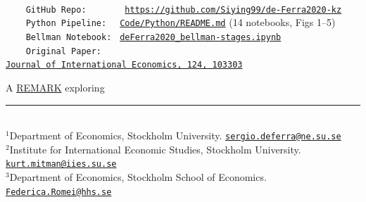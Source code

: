 \documentclass[\latexroot/\projectname]{subfiles}
\begin{document}
\providecommand{\REMARK}{\href{https://github.com/econ-ark/REMARK}{REMARK}}
\begin{footnotesize}
  \setlength{\parskip}{0pt}
  \parbox{0.9\textwidth}{
    \begin{tabbing}
      \texttt{~~~~~~~~~~~~~~~~~~~~~~~} \= \=  \\
      \texttt{~~~~GitHub~Repo:~~~~~~~} \> \> \texttt{\href{https://github.com/Siying99/de-Ferra2020-kz}{https://github.com/Siying99/de-Ferra2020-kz}} \\
      \texttt{~~~~Python~Pipeline:~~} \> \> \texttt{\href{https://github.com/Siying99/de-Ferra2020-kz/blob/main/Code/Python/README.md}{Code/Python/README.md}} \textnormal{(14 notebooks, Figs 1--5)} \\
      \texttt{~~~~Bellman~Notebook:~} \> \> \texttt{\href{https://github.com/Siying99/de-Ferra2020-kz/blob/main/deFerra2020\_bellman-stages.ipynb}{deFerra2020\_bellman-stages.ipynb}} \\
      \texttt{~~~~Original~Paper:~~~~} \> \> \texttt{\href{https://doi.org/10.1016/j.jinteco.2020.103303}{Journal~of~International~Economics,~124,~103303}} \\
    \end{tabbing}
  } %
\end{footnotesize}
\vspace{-0.3\baselineskip}

\centerline{A \href{https://github.com/econ-ark/REMARK}{REMARK} exploring \cite{de-Ferra2019-co}}
\vspace{-0.3\baselineskip}

\vfill
\begin{footnotesize}
  \noindent\rule{\textwidth}{0.4pt}\\[2pt]
  $^{1}$Department of Economics, Stockholm University.
    \href{mailto:sergio.deferra@ne.su.se}{\texttt{sergio.deferra@ne.su.se}}\\
  $^{2}$Institute for International Economic Studies, Stockholm University.
    \href{mailto:kurt.mitman@iies.su.se}{\texttt{kurt.mitman@iies.su.se}}\\
  $^{3}$Department of Economics, Stockholm School of Economics.
    \href{mailto:Federica.Romei@hhs.se}{\texttt{Federica.Romei@hhs.se}}
\end{footnotesize}


\titlepagefinish

\smartbib
\end{document}
